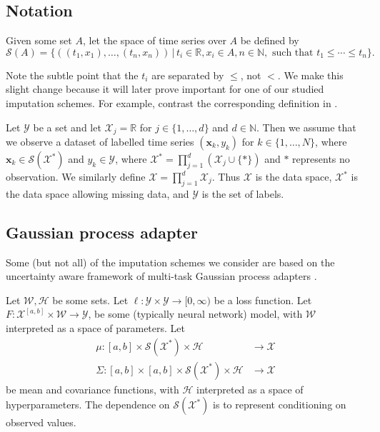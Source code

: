 \documentclass{article}
\renewcommand{\subsubsection}[1]{\textbf{#1}

} %
\newcommand{\reals}{\mathbb{R}}
\newcommand{\naturals}{\mathbb{N}}
\newcommand{\dataspace}{\mathcal{X}}
\newcommand{\lspace}{\mathcal{Y}}
\newcommand{\seriesspace}{\mathcal{S}}
\begin{document}
\subsection{Notation}
Given some set $A$, let the space of time series over $A$ be defined by
\begin{equation}
    \seriesspace(A) = \{((t_1, x_1), \ldots, (t_n, x_n)) \,\vert\, t_i \in \reals, x_i \in A, n \in \naturals, \text{ such that } t_1 \leq \cdots \leq t_n\}.\label{eq:seriesspace}
\end{equation}

Note the subtle point that the $t_i$ are separated by $\leq$, not $<$. We make this slight change because it will later prove important for one of our studied imputation schemes. For example, contrast the corresponding definition in \cite[Section 1]{toth2019gp}.

Let $\lspace$ be a set and let $\dataspace_j = \reals$ for $j \in \{1, \ldots, d\}$ and $d \in \naturals$. Then we assume that we observe a dataset of labelled time series $(\mathbf{x}_k, y_k)$ for $k \in \{1, \ldots, N\}$, where $\mathbf{x}_k \in \seriesspace(\dataspace^*)$ and $y_k \in \lspace$, where $\dataspace^* = \prod_{j = 1}^d(\dataspace_j \cup \{*\})$ and $*$ represents no observation. We similarly define
$\dataspace = \prod_{j = 1}^d\dataspace_j.$ Thus $\dataspace$ is the data space, $\dataspace^*$ is the data space allowing missing data, and $\lspace$ is the set of labels.


\subsection{Gaussian process adapter}\label{section:gpadapter}
Some (but not all) of the imputation schemes we consider are based on the uncertainty aware framework of multi-task Gaussian process adapters \cite{li2016scalable, futoma2017mgp}.

Let $\mathcal{W}, \mathcal{H}$ be some sets. Let $\ell \colon \lspace \times \lspace \to [0, \infty)$ be a loss function. Let $F \colon \dataspace^{[a, b]} \times \mathcal{W} \to \lspace$, be some (typically neural network) model, with $\mathcal{W}$ interpreted as a space of parameters. Let
\begin{align*}
\mu \colon [a, b] \times \seriesspace(\dataspace^*) \times \mathcal{H} &\to \dataspace\\
\Sigma \colon [a, b] \times [a, b] \times \seriesspace(\dataspace^*) \times \mathcal{H} &\to \dataspace    
\end{align*}
be mean and covariance functions, with $\mathcal{H}$ interpreted as a space of hyperparameters. The dependence on $\seriesspace(\dataspace^*)$ is to represent conditioning on observed values.
\end{document}
